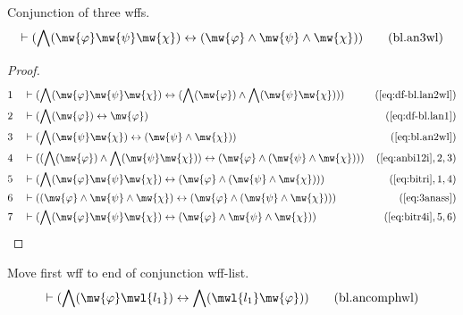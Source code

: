 \begin{lemma} Conjunction of three wffs.
\begin{align}
\vdash ( \bigwedge( \mw{\varphi} \mw{\psi} \mw{\chi} ) \leftrightarrow (
    \mw{\varphi} \wedge \mw{\psi} \wedge \mw{\chi} )
    )\label{eq:bl.an3wl}\tag{bl.an3wl}
\end{align}
\end{lemma}

\begin{proof}
\begin{align}
  1 &&  & \vdash ( \bigwedge( \mw{\varphi} \mw{\psi} \mw{\chi} ) \leftrightarrow ( \bigwedge( \mw{\varphi} ) \wedge \bigwedge( \mw{\psi} \mw{\chi} ) ) )&(\mbox{\ref{eq:df-bl.lan2wl}})\notag
  \\ 2 &&  & \vdash ( \bigwedge( \mw{\varphi} ) \leftrightarrow \mw{\varphi} )&(\mbox{\ref{eq:df-bl.lan1}})\notag
  \\ 3 &&  & \vdash ( \bigwedge( \mw{\psi} \mw{\chi} ) \leftrightarrow ( \mw{\psi} \wedge \mw{\chi} ) )&(\mbox{\ref{eq:bl.an2wl}})\notag
  \\ 4 &&  & \vdash ( ( \bigwedge( \mw{\varphi} ) \wedge \bigwedge( \mw{\psi} \mw{\chi} ) ) \leftrightarrow ( \mw{\varphi} \wedge ( \mw{\psi} \wedge \mw{\chi} ) ) )&(\mbox{\ref{eq:anbi12i}},2,3)\notag
  \\ 5 &&  & \vdash ( \bigwedge( \mw{\varphi} \mw{\psi} \mw{\chi} ) \leftrightarrow ( \mw{\varphi} \wedge ( \mw{\psi} \wedge \mw{\chi} ) ) )&(\mbox{\ref{eq:bitri}},1,4)\notag
  \\ 6 &&  & \vdash ( ( \mw{\varphi} \wedge \mw{\psi} \wedge \mw{\chi} ) \leftrightarrow ( \mw{\varphi} \wedge ( \mw{\psi} \wedge \mw{\chi} ) ) )&(\mbox{\ref{eq:3anass}})\notag
  \\ 7 &&  & \vdash ( \bigwedge( \mw{\varphi} \mw{\psi} \mw{\chi} ) \leftrightarrow ( \mw{\varphi} \wedge \mw{\psi} \wedge \mw{\chi} ) )&(\mbox{\ref{eq:bitr4i}},5,6)\notag
\end{align}
\end{proof}

\begin{lemma} Move first wff to end of conjunction
wff-list.
\begin{align}
\vdash ( \bigwedge( \mw{\varphi} \mwl{l_1} ) \leftrightarrow \bigwedge(
    \mwl{l_1} \mw{\varphi} ) )\label{eq:bl.ancomphwl}\tag{bl.ancomphwl}
\end{align}
\end{lemma}

